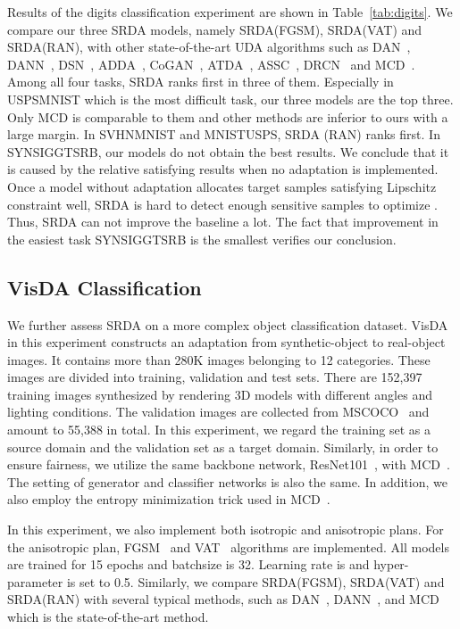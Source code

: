 \documentclass[10pt,twocolumn,letterpaper]{article}
\begin{document}
Results of the digits classification experiment are shown in Table~\ref{tab:digits}. We compare our three SRDA models, namely SRDA(FGSM), SRDA(VAT) and SRDA(RAN), with other state-of-the-art UDA algorithms such as DAN~\cite{pmlr-v37-long15}, DANN~\cite{ganin2016domain}, DSN~\cite{NIPS2016_6254}, ADDA~\cite{tzeng2017adversarial}, CoGAN~\cite{liu2016coupled}, ATDA~\cite{pmlr-v70-saito17a}, ASSC~\cite{Haeusser_2017_ICCV}, DRCN~\cite{DBLP:conf/eccv/GhifaryKZBL16} and MCD~\cite{saito2018maximum}. Among all four tasks, SRDA ranks first in three of them. Especially in USPSMNIST which is the most difficult task, our three models are the top three. Only MCD is comparable to them and other methods are inferior to ours with a large margin. In SVHNMNIST and MNISTUSPS, SRDA (RAN) ranks first. In SYNSIGGTSRB, our models do not obtain the best results. We conclude that it is caused by the relative satisfying results when no adaptation is implemented. Once a model without adaptation allocates target samples satisfying Lipschitz constraint well, SRDA is hard to detect enough sensitive samples to optimize . Thus, SRDA can not improve the baseline a lot. The fact that improvement in the easiest task SYNSIGGTSRB is the smallest verifies our conclusion. 

\subsection{VisDA Classification}

We further assess SRDA on a more complex object classification dataset. VisDA in this experiment constructs an adaptation from synthetic-object to real-object images. It contains more than 280K images belonging to 12 categories. These images are divided into training, validation and test sets. There are 152,397 training images synthesized by rendering 3D models with different angles and lighting conditions. The validation images are collected from MSCOCO~\cite{10.1007/978-3-319-10602-1_48} and amount to 55,388 in total. In this experiment, we regard the training set as a source domain and the validation set as a target domain. Similarly, in order to ensure fairness, we utilize the same backbone network, ResNet101~\cite{7780459}, with MCD~\cite{saito2018maximum}. The setting of generator and classifier networks is also the same. In addition, we also employ the entropy minimization trick used in MCD~\cite{saito2018maximum}.

In this experiment, we also implement both isotropic and anisotropic plans. For the anisotropic plan, FGSM~\cite{goodfellow2014explaining} and VAT~\cite{miyato2018virtual} algorithms are implemented. All models are trained for 15 epochs and batchsize is  32. Learning rate is  and hyper-parameter  is set to 0.5. Similarly, we compare SRDA(FGSM), SRDA(VAT) and SRDA(RAN) with several typical methods, such as DAN~\cite{pmlr-v37-long15}, DANN~\cite{ganin2016domain}, and MCD~\cite{saito2018maximum} which is the state-of-the-art method.
\end{document}
